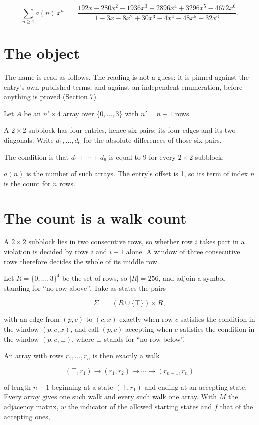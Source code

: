 \documentclass[11pt]{article}
\theoremstyle{definition}
\begin{document}
\[\sum_{n \ge 1} a(n)\,x^n \;=\; \frac{192x - 280x^{2} - 1936x^{3} + 2896x^{4} + 3296x^{5} - 4672x^{6}}{1 - 3x - 8x^{2} + 30x^{3} - 4x^{4} - 48x^{5} + 32x^{6}}.\]

\section{The object}

The name is read as follows. The reading is not a guess: it is pinned against the entry's own published terms, and against an independent enumeration, before anything is proved (Section 7).

Let $A$ be an $n' \times 4$ array over $\{0,\dots,3\}$ with $n' = n + 1$ rows.

A $2\times2$ subblock has four entries, hence six pairs: its four edges and its two diagonals. Write $d_1,\dots,d_6$ for the absolute differences of those six pairs.

The condition is that $d_1+\cdots+d_6$ is equal to $9$ for every $2\times2$ subblock.

$a(n)$ is the number of such arrays. The entry's offset is 1, so its term of index $n$ is the count for $n$ rows.

\section{The count is a walk count}

A $2\times2$ subblock lies in two consecutive rows, so whether row $i$ takes part in a violation is decided by rows $i$ and $i+1$ alone. A window of three consecutive rows therefore decides the whole of its middle row.

Let $R = \{0,\dots,3\}^{4}$ be the set of rows, so $|R| = 256$, and adjoin a symbol $\top$ standing for ``no row above''. Take as states the pairs

\[\Sigma \;=\; (R \cup \{\top\}) \times R,\]

with an edge from $(p,c)$ to $(c,x)$ exactly when row $c$ satisfies the condition in the window $(p,c,x)$, and call $(p,c)$ accepting when $c$ satisfies the condition in the window $(p,c,\bot)$, where $\bot$ stands for ``no row below''.

An array with rows $r_1,\dots,r_n$ is then exactly a walk

\[(\top,r_1) \to (r_1,r_2) \to \cdots \to (r_{n-1},r_n)\]

of length $n-1$ beginning at a state $(\top,r_1)$ and ending at an accepting state. Every array gives one such walk and every such walk one array. With $M$ the adjacency matrix, $w$ the indicator of the allowed starting states and $f$ that of the accepting ones,
\end{document}
